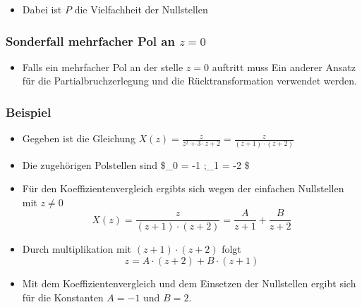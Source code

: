 \documentclass[11pt]{article}
\providecommand{\tightlist}{%
      \setlength{\itemsep}{0pt}\setlength{\parskip}{0pt}}
\begin{document}
\begin{itemize}
\tightlist
\item
  Dabei ist \(P\) die Vielfachheit der Nullstellen
\end{itemize}

    \subsubsection{\texorpdfstring{Sonderfall mehrfacher Pol an
\(z = 0\)}{Sonderfall mehrfacher Pol an z = 0}}\label{sonderfall-mehrfacher-pol-an-z-0}

\begin{itemize}
\tightlist
\item
  Falls ein mehrfacher Pol an der stelle \(z = 0\) auftritt muss Ein
  anderer Ansatz für die Partialbruchzerlegung und die
  Rücktransformation verwendet werden.
\end{itemize}

    \subsubsection{Beispiel}\label{beispiel}

\begin{itemize}
\item
  Gegeben ist die Gleichung
  \(X(z) = \frac{z}{z^2 + 3 \cdot z + 2} = \frac{z}{(z+1) \cdot (z+2)}\)
\item
  Die zugehörigen Polstellen sind \$\alpha\_0 = -1 ;\alpha\_1 = -2 \$
\end{itemize}

    \begin{itemize}
\tightlist
\item
  Für den Koeffizientenvergleich ergibts sich wegen der einfachen
  Nullstellen mit \(z \neq 0\)
  \[X(z) = \frac{z}{(z+1) \cdot (z+2)} = \frac{A}{z+1} + \frac{B}{z+2}\]
\end{itemize}

    \begin{itemize}
\tightlist
\item
  Durch multiplikation mit \((z+1) \cdot (z+2)\) folgt
  \[ z = A \cdot (z+2) + B \cdot (z+1)\]
\end{itemize}

    \begin{itemize}
\tightlist
\item
  Mit dem Koeffizientenvergleich und dem Einsetzen der Nullstellen
  ergibt sich für die Konstanten \(A = -1\) und \(B = 2\).
\end{itemize}
\end{document}

